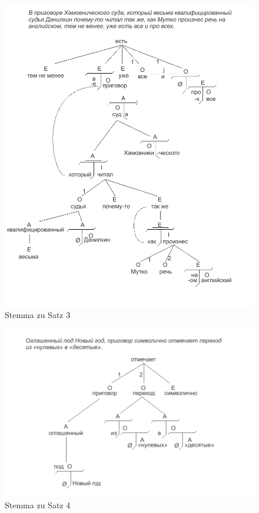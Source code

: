 \begin{figure}
    \begin{center}
        \includegraphics{anhang_a/stemma3}
        \caption{Stemma zu Satz 3}
        \label{fig:stemma3}
    \end{center}
\end{figure}

\begin{figure}
    \begin{center}
        \includegraphics{anhang_a/stemma4}
        \caption{Stemma zu Satz 4}
        \label{fig:stemma4}
    \end{center}
\end{figure}

